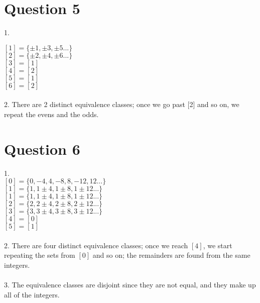 \documentclass{article}
\begin{document}
    \section*{Question 5}
    1. 
    
    
    \indent $[1] =  \{\pm 1, \pm 3, \pm 5...\}$ \\
    \indent $[2] = \{\pm 2, \pm 4, \pm 6...\}$ \\
    \indent $[3] =  [1]$ \\
    \indent $[4] = [2]$ \\
    \indent $[5] = [1]$ \\
    \indent $[6] = [2]$ \\ \\
    2.
    	There are 2 distinct equivalence classes; once we go past [2] and so on, we repeat the evens and the odds.
    \newpage
    \section*{Question 6}
    1. \\
     \indent $[0] =  \{0, -4, 4, -8, 8, -12, 12...\}$ \\
       \indent $[1] =  \{1, 1 \pm 4, 1 \pm 8, 1 \pm 12...\}$ \\
     \indent $[1] =  \{1, 1 \pm 4, 1 \pm 8, 1 \pm 12...\}$ \\
    \indent $[2] =  \{2, 2 \pm 4, 2 \pm 8, 2 \pm 12...\}$ \\   
    \indent $[3] =  \{3, 3 \pm 4, 3 \pm 8, 3 \pm 12...\}$ \\
    \indent $[4] =  [0]$ \\
    \indent $[5] = [1]$ \\    \\
    2. There are four distinct equivalence classes; once we reach $[4]$, we start repeating the sets from $[0]$ and so on; the remainders are found from the same integers. \\  \\
    3. The equivalence classes are disjoint since they are not equal, and they make up all of the integers.
   
\end{document}
